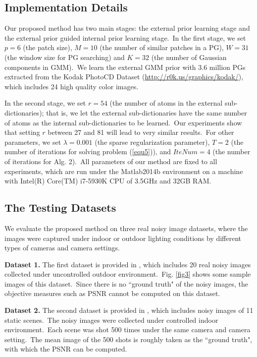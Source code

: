 \subsection{Implementation Details}

Our proposed method has two main stages: the external prior learning stage and the external prior guided internal prior learning stage.\ In the first stage, we set $p = 6$ (the patch size), $M = 10$ (the number of similar patches in a PG), $W = 31$ (the window size for PG searching) and $K = 32$ (the number of Gaussian components in GMM).\ We learn the external GMM prior with 3.6 million PGs extracted from the Kodak PhotoCD Dataset (\url{http://r0k.us/graphics/kodak/}), which includes 24 high quality color images. 

In the second stage, we set $r = 54$ (the number of atoms in the external sub-dictionaries); that is, we let the external sub-dictionaries have the same number of atoms as the internal sub-dictionaries to be learned.\ Our experiments show that setting $r$ between 27 and 81 will lead to very similar results.\ For other parameters, we set $\lambda=0.001$ (the sparse regularization parameter), $T = 2$ (the number of iterations for solving problem (\ref{equ5})), and $IteNum = 4$ (the number of iterations for Alg. 2).\ All parameters of our method are fixed to all experiments, which are run under the Matlab2014b environment on a machine with Intel(R) Core(TM) i7-5930K CPU of 3.5GHz and 32GB RAM.

\subsection{The Testing Datasets}

We evaluate the proposed method on three real noisy image datasets, where the images were captured under indoor or outdoor lighting conditions by different types of cameras and camera settings. 

\textbf{Dataset 1.} The first dataset is provided in \cite{ncwebsite}, which includes 20 real noisy images collected under uncontrolled outdoor environment.\ Fig. \ref{fig3} shows some sample images of this dataset.\ Since there is no ``ground truth" of the noisy images, the objective measures such as PSNR cannot be computed on this dataset. 

\textbf{Dataset 2.} The second dataset is provided in \cite{crosschannel2016}, which includes noisy images of 11 static scenes.\ The noisy images were collected under controlled indoor environment.\ Each scene was shot 500 times under the same camera and camera setting.\ The mean image of the 500 shots is roughly taken as the ``ground truth", with which the PSNR can be computed. 

